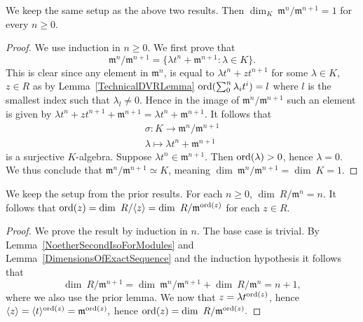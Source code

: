     \begin{lemma}
        We keep the same setup as the above two results. Then $\dim_K\ \mathfrak{m}^n/\mathfrak{m}^{n+1} = 1$ for every $n\geq 0$. 
    \end{lemma}
    \begin{proof}
        We use induction in $n\geq 0$. We first prove that 
        $$\mathfrak{m}^n/\mathfrak{m}^{n+1} = \{ \lambda t^n + \mathfrak{m}^{n+1} : \lambda\in K\}.$$
        This is clear since any element in $\mathfrak{m}^n$, is equal to $\lambda t^n + zt^{n+1}$ for some $\lambda\in K$, $z\in R$ as by Lemma~\ref{TechnicalDVRLemma} $\mathrm{ord}(\sum_0^n\lambda_it^i) = l$ where $l$ is the smallest index such that $\lambda_l\neq 0$. Hence in the image of $\mathfrak{m}^n/\mathfrak{m}^{n+1}$ such an element is given by $\lambda t^n + zt^{n+1} + \mathfrak{m}^{n+1} = \lambda t^n + \mathfrak{m}^{n+1}$. It follows that 
        \begin{gather*}
            \sigma : K \rightarrow \mathfrak{m}^n/\mathfrak{m}^{n+1}\\
            \lambda \mapsto \lambda t^n+\mathfrak{m}^{n+1}
        \end{gather*}
        is a surjective $K$-algebra. Suppose $\lambda t^n \in \mathfrak{m}^{n+1}$. Then $\mathrm{ord}(\lambda)>0$, hence $\lambda = 0$. We thus conclude that $\mathfrak{m}^n/\mathfrak{m}^{n+1} \simeq K$, meaning $\dim \ \mathfrak{m}^n/\mathfrak{m}^{n+1} = \dim\ K = 1.$
    \end{proof}
    \begin{lemma}\label{OrderIsDimensionOfQuotientKAlg}
        We keep the setup from the prior results. For each $n\geq 0$, $\dim\ R/\mathfrak{m}^n = n$. It follows that $\mathrm{ord}(z) = \dim\ R/\langle z\rangle =  \dim\ R/\mathfrak{m}^{\mathrm{ord}(z)}$ for each $z\in R$.
    \end{lemma}
    \begin{proof}
        We prove the result by induction in $n$. The base case is trivial. By Lemma~\ref{NoetherSecondIsoForModules} and Lemma~\ref{DimensionsOfExactSequence} and the induction hypothesis it follows that 
        $$\dim\ R/\mathfrak{m}^{n+1} = \dim\ \mathfrak{m}^n/\mathfrak{m}^{n+1}+\dim\ R/\mathfrak{m}^n = n+1,$$
        where we also use the prior lemma. We now that $z = \lambda t^{\mathrm{ord}(z)}$, hence $\langle z \rangle = \langle t\rangle^{\mathrm{ord}(z)} = \mathfrak{m}^{\mathrm{ord}(z)},$ hence $\mathrm{ord}(z) = \dim \ R/\mathfrak{m}^{\mathrm{ord}(z)}.$
    \end{proof}    
